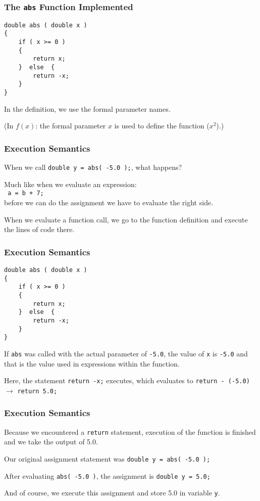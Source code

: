 \begin{frame}[fragile]
\frametitle{The \texttt{abs} Function Implemented}

\begin{verbatim}
double abs ( double x ) 
{
    if ( x >= 0 ) 
    {
        return x;
    }  else  {
        return -x;
    }
}
\end{verbatim}

In the definition, we use the formal parameter names. 

(In $f(x)$: the formal parameter $x$ is used to define the function ($x^{2}$).)

\end{frame}

\begin{frame}[fragile]
\frametitle{Execution Semantics}
When we call \texttt{double y = abs( -5.0 );}, what happens?

Much like when we evaluate an expression:\\
\quad \texttt{ a = b + 7;}\\
before we can do the assignment we have to evaluate the right side.

When we evaluate a function call, we go to the function definition and execute the lines of code there.

\end{frame}

\begin{frame}[fragile]
\frametitle{Execution Semantics}

\begin{verbatim}
double abs ( double x ) 
{
    if ( x >= 0 ) 
    {
        return x;
    }  else  {
        return -x;
    }
}
\end{verbatim}

If \texttt{abs} was called with the actual parameter of \texttt{-5.0}, the value of \texttt{x} is \texttt{-5.0} and that is the value used in expressions within the function.

Here, the statement \texttt{return -x;} executes, which evaluates to \texttt{return - (-5.0)} $\rightarrow$ \texttt{return 5.0;}

\end{frame}

\begin{frame}
\frametitle{Execution Semantics}

Because we encountered a \texttt{return} statement, execution of the function is finished and we take the output of 5.0.

Our original assignment statement was \texttt{double y = abs( -5.0 );}

After evaluating \texttt{abs( -5.0 )}, the assignment is \texttt{double y = 5.0;}

And of course, we execute this assignment and store 5.0 in variable \texttt{y}.

\end{frame}

